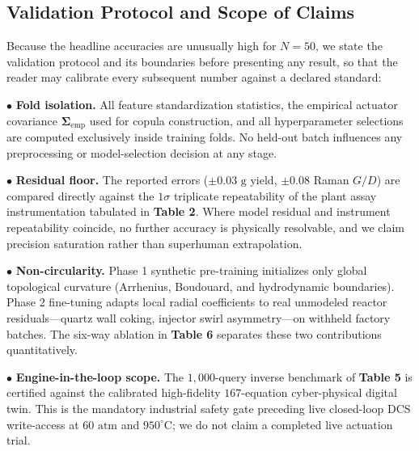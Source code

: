 \documentclass[10pt,journal,onecolumn]{IEEEtran}
\begin{document}
\subsection{Validation Protocol and Scope of Claims}
Because the headline accuracies are unusually high for $N = 50$, we state the validation protocol and its boundaries before presenting any result, so that the reader may calibrate every subsequent number against a declared standard:

\noindent $\bullet$ \textbf{Fold isolation.} All feature standardization statistics, the empirical actuator covariance $\boldsymbol{\Sigma}_{\text{emp}}$ used for copula construction, and all hyperparameter selections are computed exclusively inside training folds. No held-out batch influences any preprocessing or model-selection decision at any stage.\par\smallskip
\noindent $\bullet$ \textbf{Residual floor.} The reported errors ($\pm 0.03\text{ g}$ yield, $\pm 0.08$ Raman $G/D$) are compared directly against the $1\sigma$ triplicate repeatability of the plant assay instrumentation tabulated in \textbf{Table 2}. Where model residual and instrument repeatability coincide, no further accuracy is physically resolvable, and we claim precision saturation rather than superhuman extrapolation.\par\smallskip
\noindent $\bullet$ \textbf{Non-circularity.} Phase 1 synthetic pre-training initializes only global topological curvature (Arrhenius, Boudouard, and hydrodynamic boundaries). Phase 2 fine-tuning adapts local radial coefficients to real unmodeled reactor residuals—quartz wall coking, injector swirl asymmetry—on withheld factory batches. The six-way ablation in \textbf{Table 6} separates these two contributions quantitatively.\par\smallskip
\noindent $\bullet$ \textbf{Engine-in-the-loop scope.} The $1,000$-query inverse benchmark of \textbf{Table 5} is certified against the calibrated high-fidelity $167$-equation cyber-physical digital twin. This is the mandatory industrial safety gate preceding live closed-loop DCS write-access at $60\text{ atm}$ and $950^\circ\text{C}$; we do not claim a completed live actuation trial.\par\smallskip
\end{document}
